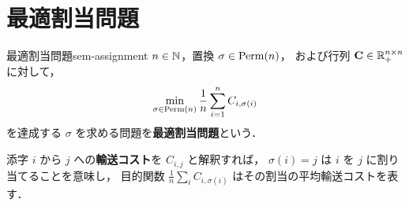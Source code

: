 \section{最適割当問題}
\label{sec:sem-assignment}

\begin{definition}{最適割当問題}{sem-assignment}
  $n \in \mathbb{N}$，置換 $\sigma \in \operatorname{Perm}(n)$，
  および行列 $\mathbf{C} \in \mathbb{R}_+^{n \times n}$ に対して，
  \[
    \min_{\sigma \in \operatorname{Perm}(n)} \frac{1}{n} \sum_{i=1}^{n} C_{i, \sigma(i)}
  \]
  を達成する $\sigma$ を求める問題を\textbf{最適割当問題}という．
\end{definition}

添字 $i$ から $j$ への\textbf{輸送コスト}を $C_{i,j}$ と解釈すれば，
$\sigma(i) = j$ は $i$ を $j$ に割り当てることを意味し，
目的関数 $\frac{1}{n}\sum_i C_{i, \sigma(i)}$ はその割当の平均輸送コストを表す．

